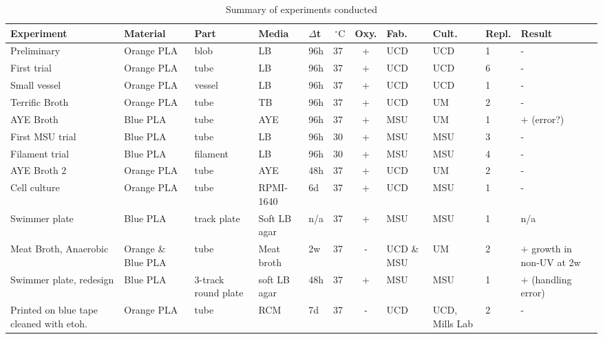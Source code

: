 \documentclass[fleqn,10pt]{wlpeerj}
\begin{document}
\begin{table}[h]
\centering
\caption{Summary of experiments conducted}
\label{summary_table}
\small
\begin{tabular}{@{}p{6em}p{4em}p{2em}p{2em}p{2em}p{1em}cp{2em}p{2em}p{3em}p{6em}@{}}
\toprule
Experiment & Material & Part & Media & $\Delta$t & $\,^{\circ}\mathrm{C}$ & \multicolumn{1}{l}{Oxy.} & Fab. & Cult. & \multicolumn{1}{l}{Repl.} & Result \\ \hline
Preliminary \cite{tweet_conjecture, tweet_first_result_1, tweet_first_result_2} & Orange PLA & blob & LB & 96h & 37 & + & UCD & UCD & 1 & - \\
First trial \cite{tweet_2nd_test, tweet_2nd_result} & Orange PLA & tube & LB & 96h & 37 & + & UCD & UCD & 6 & - \\
Small vessel \cite{tweet_mini_flask} & Orange PLA & vessel & LB & 96h & 37 & + & UCD & UCD & 1 & - \\
Terrific Broth \cite{tweet_terrific_aye, tweet_aye_96h} & Orange PLA & tube & TB & 96h & 37 & + & UCD & UM & 2 & - \\
AYE Broth \cite{tweet_aye_96h} & Blue PLA & tube & AYE & 96h & 37 & + & MSU & UM & 1 & $+$ (error?) \\
First MSU trial \cite{tweet_luis_24h, tweet_luis_48h} & Blue PLA & tube & LB & 96h & 30 & + & MSU & MSU & 3 & - \\
Filament trial \cite{tweet_filament_interior} & Blue PLA & filament & LB & 96h & 30 & + & MSU & MSU & 4 & - \\
AYE Broth 2 \cite{tweet_aye_2nd_test} & Orange PLA & tube & AYE & 48h & 37 & + & UCD & UM & 2 & - \\
Cell culture & Orange PLA & tube & RPMI-1640 & 6d & 37 & + & UCD & MSU & 1 & - \\
Swimmer plate \cite{tweet_swimming_tracks_1} & Blue PLA & track plate & Soft LB agar & n/a & 37 & + & MSU & MSU & 1 & n/a \\
Meat Broth, Anaerobic \cite{tweet_meat_broth_result} & Orange \& Blue PLA & tube & Meat broth & 2w & 37 & - & UCD \& MSU & UM & 2 & $+$ growth in non-UV at 2w \\
Swimmer plate, redesign \cite{tweet_swimming_tracks_2} & Blue PLA & 3-track round plate & soft LB agar & 48h & 37 & + & MSU & MSU & 1 & $+$ (handling error) \\
Printed on blue tape cleaned with etoh.\cite{zactlewis2014} & Orange PLA & tube & RCM & 7d & 37 & - & UCD & UCD, Mills Lab & 2 & -
\end{tabular}
\end{table}
\end{document}
